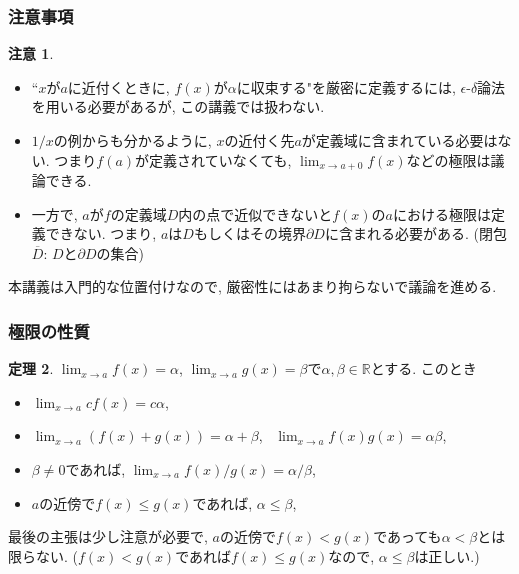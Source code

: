 \documentclass[dvipdfmx,cjk,10.2pt]{beamer}
\newcommand{\R}{\mathbb{R}}
\theoremstyle{definition}
\newtheorem{Thm}{定理}[section]
\newtheorem{Rem}[Thm]{注意}
\begin{document}


\begin{frame}
\frametitle{注意事項} 


\begin{Rem}
\begin{itemize}
\item ``$x$が$a$に近付くときに, $f(x)$が$\alpha$に収束する"を厳密に定義するには, $\epsilon$-$\delta$論法を用いる必要があるが, この講義では扱わない. 
\item $1/x$の例からも分かるように, $x$の近付く先$a$が定義域に含まれている必要はない. 
つまり$f(a)$が定義されていなくても, $\displaystyle \lim_{x \to a+0}f(x)$などの極限は議論できる. 
\item 一方で, $a$が$f$の定義域$D$内の点で近似できないと$f(x)$の$a$における極限は定義できない. 
つまり, $a$は$D$もしくはその境界$\partial D$に含まれる必要がある. (閉包$\overline{D}$: $D$と$\partial D$の集合)
\end{itemize}
\end{Rem}

本講義は入門的な位置付けなので, 厳密性にはあまり拘らないで議論を進める. 

\end{frame}





\begin{frame}
\frametitle{極限の性質} 


\begin{Thm}
$\displaystyle \lim_{x\to a}f(x)=\alpha$, $\displaystyle \lim_{x\to a}g(x)=\beta$で$\alpha,\beta \in \R$とする. 
このとき
\begin{itemize}
\item $\displaystyle \lim_{x\to a} cf(x)=c \alpha$, \vspace{1mm}
\item $\displaystyle \lim_{x\to a}(f(x)+g(x))=\alpha+\beta$, \ $\displaystyle \lim_{x\to a}f(x)g(x)=\alpha\beta$,  \vspace{1mm}
\item $\beta \neq0$であれば, $\displaystyle \lim_{x\to a}f(x)/g(x)=\alpha/\beta$,  \vspace{1mm}
\item $a$の近傍で$f(x)\le g(x)$であれば, $\alpha \le \beta$, 
\end{itemize}
\end{Thm}

最後の主張は少し注意が必要で, $a$の近傍で$f(x)< g(x)$であっても$\alpha < \beta$とは限らない.  
($f(x)< g(x)$であれば$f(x)\le g(x)$なので, $\alpha \le \beta$は正しい.)

\end{frame}
\end{document}
